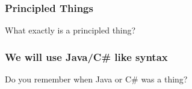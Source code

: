 \begin{frame}
\frametitle{Principled Things}

\begin{center}What exactly is a principled thing?\end{center}

\end{frame}

\begin{frame}
\frametitle{We will use Java/C# like syntax}

\begin{center}Do you remember when Java or C# was a thing?\end{center}

\end{frame}
